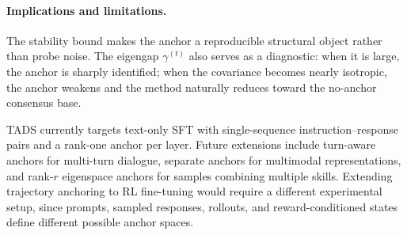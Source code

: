 \paragraph{Implications and limitations.}
The stability bound makes the anchor a reproducible structural
object rather than probe noise. The eigengap $\gamma^{(t)}$ also
serves as a diagnostic: when it is large, the anchor is sharply
identified; when the covariance becomes nearly isotropic, the anchor
weakens and the method naturally reduces toward the no-anchor
consensus base.

\textsc{TADS} currently targets text-only SFT with single-sequence
instruction--response pairs and a rank-one anchor per layer. Future
extensions include turn-aware anchors for multi-turn dialogue,
separate anchors for multimodal representations, and rank-$r$
eigenspace anchors for samples combining multiple skills. Extending
trajectory anchoring to RL fine-tuning would require a different
experimental setup, since prompts, sampled responses, rollouts, and
reward-conditioned states define different possible anchor spaces.
